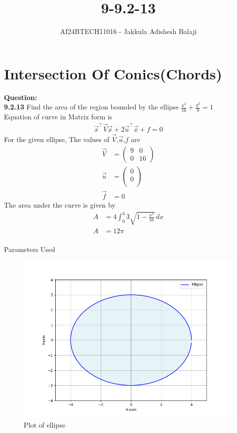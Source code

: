 \documentclass[journal]{IEEEtran}
\begin{document}

\setlength{\intextsep}{10pt} %

\title{9-9.2-13}
\author{AI24BTECH11016 - Jakkula Adishesh Balaji}
\maketitle
\section*{\textbf{Intersection Of Conics(Chords)}}
\parindent 0pt
\textbf{Question:} \\
\textbf{9.2.13} Find the area of the region bounded by the ellipse $\frac{x^{2}}{16} + \frac{y^{2}}{9} = 1$\\
\solution
Equation of curve in Matrix form is \\
\begin{align}
\vec{x}^\top\vec{V}\vec{x} + 2\vec{u}^\top\vec{x} + f = 0
\end{align}
For the given ellipse, The values of $\vec{V}$,$\vec{u}$,$f$ are
\begin{align}
\vec{V}&=\begin{pmatrix}9 & 0\\0 & 16\end{pmatrix}\\
\vec{u}&=\begin{pmatrix}0\\0\\\end{pmatrix} \\
\vec{f}&=0
\end{align}
The area under the curve is given by \\
\begin{align}
A &= 4 \int_0^4 3 \sqrt{1 - \frac{x^2}{16}} \, dx \\
A &= 12\pi \\
\end{align}
\begin{table}[h!]    	
    \centering
     
    \caption{Parameters Used}
    \label{tab:1-1.9-6}
\end{table}
\begin{figure}[h!]
    \centering
    \includegraphics[width = 1\linewidth]{figs/Figure_1.png}
    \caption{Plot of ellipse}
    \label{fig:stemplot}
\end{figure}
\end{document}

